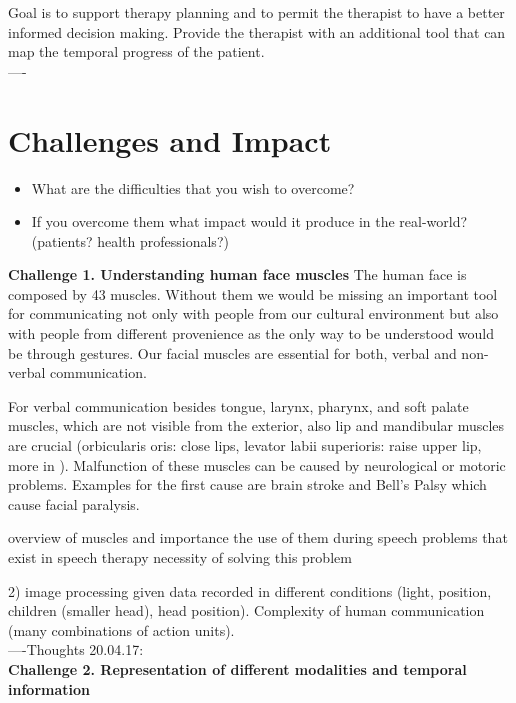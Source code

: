 Goal is to support therapy planning and to permit the therapist to have a better informed decision making. Provide the therapist with an additional tool that can map the temporal progress of the patient. \\ 
----\\

\section{Challenges and Impact}

\begin{itemize}
    \item What are the difficulties that you wish to overcome?
    \item If you overcome them what impact would it produce in the real-world? (patients? health professionals?)
\end{itemize}

\textbf{Challenge 1. Understanding human face muscles}
The human face is composed by 43 muscles. Without them we would be missing an important tool for communicating not only with people from our cultural environment but also with people from different provenience as the only way to be understood would be through gestures. Our facial muscles are essential for both, verbal and non-verbal communication.\par 
For verbal communication besides tongue, larynx, pharynx, and soft palate muscles, which are not visible from the exterior, also lip and mandibular muscles are crucial (orbicularis oris: close lips, levator labii superioris: raise upper lip, more in \cite{PhonManual}). 
Malfunction of these muscles can be caused by neurological or motoric problems. Examples for the first cause are brain stroke and Bell's Palsy which cause facial paralysis.

overview of muscles and importance
the use of them during speech
problems that exist in speech therapy
necessity of solving this problem

2) image processing given data recorded in different conditions (light, position, children (smaller head), head position). Complexity of human communication (many combinations of action units).\\


----Thoughts 20.04.17:\\
\textbf{Challenge 2. Representation of different modalities and temporal information}

